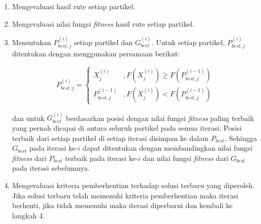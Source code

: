 {{\begin{enumerate}[align = left, left = 0cm, nolistsep]
        \item Mengevaluasi hasil rute setiap partikel.
        \item Mengevaluasi nilai fungsi \textit{fitness} hasil rute setiap partikel.
        \item Menentukan $P_{best,j}^{(i)}$ setiap partikel dan $G_{best}^{(i)}$. Untuk setiap partikel, $P_{best,j}^{(i)}$ ditentukan dengan menggunakan persamaan berikut:

              \begin{equation}
                  \label{pers: penentuan pbest}
                  P_{best,j}^{(i)} = \begin{cases} X_{j}^{(i)} & , F(X_{j}^{(i)}) \geq F(P_{best,j}^{(i-1)}) \\ P_{best,j}^{(i-1)} &, F(X_{j}^{(i)}) < F(P_{best,j}^{(i-1)}) \end{cases}
              \end{equation}

              dan untuk $G_{best}^{(i)}$ berdasarkan posisi dengan nilai fungsi \textit{fitness} paling terbaik yang pernah dicapai di antara seluruh partikel pada semua iterasi.
              Posisi terbaik dari setiap partikel di setiap iterasi disimpan ke dalam $P_{best}$.
              Sehingga $G_{best}$ pada iterasi ke-$i$ dapat ditentukan dengan membandingkan nilai fungsi \textit{fitness} dari $P_{best}$ terbaik pada iterasi ke-$i$ dan nilai fungsi \textit{fitness} dari $G_{best}$ pada iterasi sebelumnya.

        \item Mengevaluasi kriteria pemberhentian terhadap solusi terbaru yang diperoleh. Jika solusi terbaru telah memenuhi kriteria pemberhentian maka iterasi berhenti, jika tidak memenuhi maka iterasi diperbarui dan kembali ke langkah 4.
    \end{enumerate}

}

}
\vspace{-3mm}


